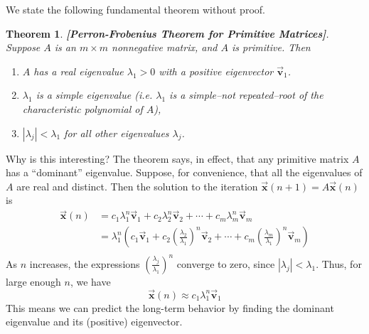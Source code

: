 \documentclass[reqno]{immbook}
\newcommand{\BV}{\vec{\textbf{v}}}
\newcommand{\BX}{\vec{\textbf{x}}}
\numberwithin{equation}{chapter}
\newtheorem{theorem}{Theorem}
\numberwithin{question}{section}
\numberwithin{theorem}{chapter}
\numberwithin{figure}{chapter}
\theoremstyle{definition}
\begin{document}
We state the following fundamental theorem without
proof.
\begin{theorem}
\textrm{\textbf{[Perron-Frobenius Theorem for Primitive Matrices]}}.
Suppose $A$ is an $m\times m$ nonnegative matrix, and $A$ is primitive.
Then
\begin{enumerate}
\item $A$ has a real eigenvalue $\lambda_1>0$ with 
a positive eigenvector $\BV_1$.
\item $\lambda_1$ is a simple eigenvalue
(i.e. $\lambda_1$ is a simple--not repeated--root
of the characteristic polynomial of $A$),
\item $|\lambda_j| < \lambda_1$ for all other eigenvalues
$\lambda_j$.
\end{enumerate}
\end{theorem}

% 

Why is this interesting?  The theorem says, in effect,
that any primitive matrix $A$ has a ``dominant'' eigenvalue.
Suppose, for
convenience, that all the eigenvalues of $A$ are real
and distinct.  Then the solution to the iteration
$\BX(n+1) = A\BX(n)$ is
\begin{equation}
\begin{split}
  \BX(n) & = c_1 \lambda_1^n \BV_1 + c_2 \lambda_2^n \BV_2
                 + \cdots + c_m \lambda_m^n \BV_m \\
           & = \lambda_1^n \left( c_1 \BV_1 
	      + c_2 \left(\frac{\lambda_2}{\lambda_1}\right)^n \BV_2
                 + \cdots 
              + c_m \left(\frac{\lambda_m}{\lambda_1}\right)^n \BV_m \right) \\
\end{split} 
\end{equation}
As $n$ increases, the expressions
$\left(\frac{\lambda_j}{\lambda_1}\right)^n$
converge to zero, since $|\lambda_j| < \lambda_1$.
Thus, for large enough $n$, we have
\begin{equation}
   \BX(n) \approx c_1 \lambda_1^n \BV_1
\end{equation}
This means we can predict the long-term behavior
by finding the dominant eigenvalue and its (positive)
eigenvector.
\end{document}
